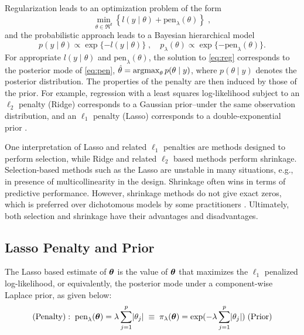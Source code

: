 \documentclass[11pt]{article}
\begin{document}
Regularization leads to an optimization problem of the form 
\begin{equation}
  \min_{\theta \in \Re^d}
  \left\{
    l(y \mid \theta) + \text{pen}_{\lambda}(\theta) 
  \right\}
  \;, 
  \label{eq:reg}
\end{equation}
and the probabilistic approach leads to a Bayesian hierarchical model
\begin{equation}
  p(y \mid \theta) \propto \exp\{-l(y \mid \theta)\} \; , \quad p_{\lambda}(\theta)
  \propto \exp\{ -\text{pen}_{\lambda}(\theta) \}. 
  \label{eq:pen}
\end{equation}
For appropriate $l(y \mid \theta)$ and $\text{pen}_{\lambda}(\theta)$, the
solution to \eqref{eq:reg} corresponds to the posterior mode of
\eqref{eq:pen}, $\hat{\theta} = \argmax_\theta p(\theta \mid y)$, where
$p(\theta \mid y)$ denotes the posterior distribution. The properties of the
penalty are then induced by those of the prior.  For example, regression with a
least squares log-likelihood subject to an $\ell_2$ penalty (Ridge) corresponds to
a \citep{hoerl70} Gaussian prior--under the same observation distribution, and 
an $\ell_1$ penalty (Lasso) \citep{tibshirani96} corresponds to a
double-exponential prior \citep{park_bayesian_2008}.

One interpretation of Lasso and related $\ell_1$ penalties are methods designed
to perform selection, while Ridge and related $\ell_2$ based methods perform
shrinkage. Selection-based methods such as the Lasso are unstable in many
situations, e.g., in presence of multicollinearity in the design. Shrinkage
often wins in terms of predictive performance. However, shrinkage methods do not
give exact zeros, which is preferred over dichotomous models by some
practitioners \citep{stephens2009bayesian}.  Ultimately, both selection and shrinkage
have their advantages and disadvantages. 

\subsection{Lasso Penalty and Prior}\label{sec:lasso}

The Lasso based estimate of $\boldsymbol{\theta}$ is the value of $\boldsymbol{\theta}$ that maximizes the $\ell_1$ penalized log-likelihood, or equivalently, the posterior mode under a component-wise Laplace prior, as given below: 
\begin{equation}
  (\text{Penalty}): \; \text{pen}_{\lambda}(\boldsymbol{\theta}) = \lambda \sum_{j = 1}^{p}
  \lvert\theta_j\rvert \; \equiv \; \pi_{\lambda}(\boldsymbol{\theta}) = \exp( - \lambda \sum_{j =
  1}^{p} \lvert\theta_j\rvert) \; (\text{Prior})
\end{equation}
\end{document}
